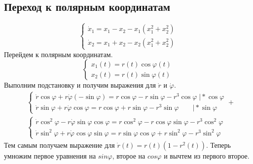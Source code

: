 %
%
% 
\subsection{Переход к полярным координатам}
\begin{equation}
\begin{cases}
  \dot{x}_1=x_1-x_2-x_1(x_1^2+x_2^2)\\
  \dot{x}_2=x_1+x_2-x_2(x_1^2+x_2^2)
\end{cases}
\end{equation}
Перейдем к полярным координатам.
\begin{equation}
  \begin{cases}
    x_1(t)=r(t)\cos{\varphi(t)}\\
    x_2(t)=r(t)\sin{\varphi(t)}
  \end{cases}
\end{equation}
Выполним подстановку и получим выражения для $\dot{r}$ и $\dot{\varphi}$.
\begin{align}
  &\begin{cases}
    \dot{r}\cos{\varphi}+r\dot{\varphi}(-\sin{\varphi})=r\cos{\varphi}-r\sin{\varphi}-r^3\cos{\varphi}\;\big|*\cos{\varphi}\\
    \dot{r}\sin{\varphi}+r\dot{\varphi}\cos{\varphi}=r\cos{\varphi}+r\sin{\varphi}-r^3\sin{\varphi}\quad\quad\big|*\sin{\varphi}
  \end{cases}+\\
  &\begin{cases}
    \dot{r}\cos^2{\varphi}-r\dot{\varphi}\sin{\varphi}\cos{\varphi}=
    r\cos^2{\varphi}-r\cos{\varphi}\sin{\varphi}-r^3\cos^2{\varphi}\\
    \dot{r}\sin^2{\varphi}+r\dot{\varphi}\cos{\varphi}\sin{\varphi}=
    r\sin{\varphi}\cos{\varphi}+r\sin^2{\varphi}-r^3\sin^2{\varphi}
  \end{cases}
\end{align}
Тем самым получаем выражение для $\dot{r}(t)=r(t)(1-r^2(t))$. Теперь умножим первое уравнения на $sin{\varphi}$,
второе на $cos{\varphi}$ и вычтем из первого второе.

